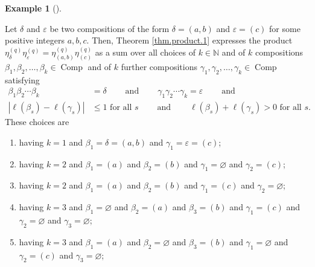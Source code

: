 \documentclass[numbers=enddot,12pt,final,onecolumn,notitlepage]{scrartcl}%
\theoremstyle{definition}
\newtheorem{exam}[theo]{Example}
\newenvironment{example}[1][]
{\begin{exam}[#1]\begin{leftbar}}
{\end{leftbar}\end{exam}}
\begin{document}
\begin{example}
\label{exa.product.1.ab*c}Let $\delta$ and $\varepsilon$ be two compositions
of the form $\delta=\left(  a,b\right)  $ and $\varepsilon=\left(  c\right)  $
for some positive integers $a,b,c$. Then, Theorem \ref{thm.product.1}
expresses the product $\eta_{\delta}^{\left(  q\right)  }\eta_{\varepsilon
}^{\left(  q\right)  }=\eta_{\left(  a,b\right)  }^{\left(  q\right)  }%
\eta_{\left(  c\right)  }^{\left(  q\right)  }$ as a sum over all choices of
$k\in\mathbb{N}$ and of $k$ compositions $\beta_{1},\beta_{2},\ldots,\beta
_{k}\in\operatorname*{Comp}$ and of $k$ further compositions $\gamma
_{1},\gamma_{2},\ldots,\gamma_{k}\in\operatorname*{Comp}$ satisfying%
\begin{align*}
\beta_{1}\beta_{2}\cdots\beta_{k}  &  =\delta\ \ \ \ \ \ \ \ \ \ \text{and}%
\ \ \ \ \ \ \ \ \ \ \gamma_{1}\gamma_{2}\cdots\gamma_{k}=\varepsilon
\ \ \ \ \ \ \ \ \ \ \text{and}\\
\left\vert \ell\left(  \beta_{s}\right)  -\ell\left(  \gamma_{s}\right)
\right\vert  &  \leq1\text{ for all }s\ \ \ \ \ \ \ \ \ \ \text{and}%
\ \ \ \ \ \ \ \ \ \ \ell\left(  \beta_{s}\right)  +\ell\left(  \gamma
_{s}\right)  >0\text{ for all }s.
\end{align*}
These choices are

\begin{enumerate}
\item having $k=1$ and $\beta_{1}=\delta=\left(  a,b\right)  $ and $\gamma
_{1}=\varepsilon=\left(  c\right)  $;

\item having $k=2$ and $\beta_{1}=\left(  a\right)  $ and $\beta_{2}=\left(
b\right)  $ and $\gamma_{1}=\varnothing$ and $\gamma_{2}=\left(  c\right)  $;

\item having $k=2$ and $\beta_{1}=\left(  a\right)  $ and $\beta_{2}=\left(
b\right)  $ and $\gamma_{1}=\left(  c\right)  $ and $\gamma_{2}=\varnothing$;

\item having $k=3$ and $\beta_{1}=\varnothing$ and $\beta_{2}=\left(
a\right)  $ and $\beta_{3}=\left(  b\right)  $ and $\gamma_{1}=\left(
c\right)  $ and $\gamma_{2}=\varnothing$ and $\gamma_{3}=\varnothing$;

\item having $k=3$ and $\beta_{1}=\left(  a\right)  $ and $\beta
_{2}=\varnothing$ and $\beta_{3}=\left(  b\right)  $ and $\gamma
_{1}=\varnothing$ and $\gamma_{2}=\left(  c\right)  $ and $\gamma
_{3}=\varnothing$;


\end{enumerate}
\end{example}
\end{document}
